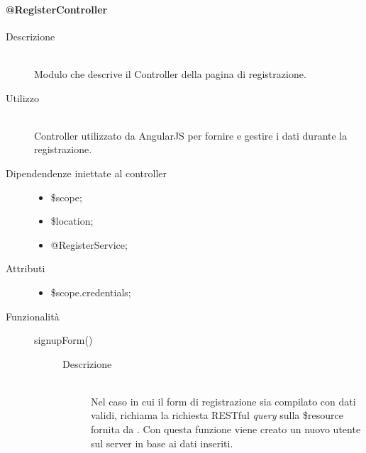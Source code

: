 \paragraph{@RegisterController}
\begin{description}
 \item[Descrizione] \hfill \\
 Modulo che descrive il Controller della pagina di registrazione.
 
 \item[Utilizzo] \hfill \\
 Controller utilizzato da AngularJS per fornire e gestire i dati durante la registrazione.
 
 \item[Dipendendenze iniettate al controller] \hfill
 \begin{itemize}
  \item \$scope;
  \item \$location;
  \item @RegisterService;
  
 \end{itemize}
 
 \item[Attributi] \hfill
 \begin{itemize}
 \item  \$scope.credentials;
 \end{itemize}
 
 \item[Funzionalità] \hfill
 \begin{description}
  \item[signupForm()] \hfill
  \begin{description}
   	\item[Descrizione] \hfill \\
  Nel caso in cui il form di registrazione sia compilato con dati validi, richiama la richiesta RESTful \textit{query} sulla \$resource 
  fornita da .
  Con questa funzione viene creato un nuovo utente sul server in base ai dati inseriti.
   \end{description}

  
 \end{description}
\end{description}


